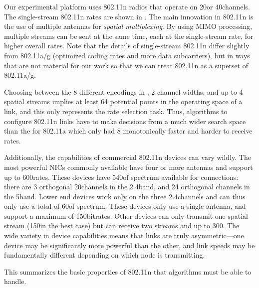 Our experimental platform uses 802.11n radios that operate on 20\MHz or 40\MHz channels.
The single-stream 802.11n rates are shown in . 
The main innovation in 802.11n is the use of multiple antennas for  \emph{spatial multiplexing}. By using MIMO processing, multiple streams can be sent at the same time, each at the single-stream rate, for higher overall rates. Note that the details of single-stream 802.11n differ slightly from 802.11a/g (optimized coding rates and more data subcarriers), but in ways that are not material for our work so that we can treat 802.11n as a superset of 802.11a/g.

Choosing between the 8 different encodings in , 2 channel widths, and up to 4 spatial streams implies at least 64 potential points in the operating space of a link, and this only represents the rate selection task. Thus, algorithms to configure 802.11n links have to make decisions from a much wider search space than the for 802.11a which only had 8 monotonically faster and harder to receive rates. 

Additionally, the capabilities of commercial 802.11n devices can vary wildly. The most powerful NICs commonly available have four or more antennas and support up to 600\Mbps rates. These devices have 540\MHz of spectrum available for connections: there are 3 orthogonal 20\MHz channels in the 2.4\GHz band, and 24 orthogonal channels in the 5\GHz band. Lower end devices work only on the three 2.4\GHz channels and can thus only use a total of 60\MHz of spectrum. These devices only use a single antenna, and support a maximum of 150\Mbps bitrates. Other devices can only transmit one spatial stream (150\Mbps in the best case) but can receive two streams and up to 300\Mbps. The wide variety in device capabilities means that links are truly asymmetric---one device may be significantly more powerful than the other, and link speeds may be fundamentally different depending on which node is transmitting.

This summarizes the basic properties of 802.11n that algorithms must be able to handle.

